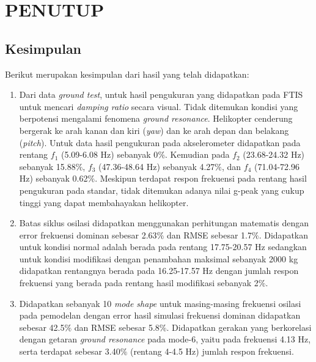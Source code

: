 \chapter{PENUTUP}
\label{chap:penutup}


\section{Kesimpulan}
\label{sec:kesimpulan}
\thispagestyle{newchap}

Berikut merupakan kesimpulan dari hasil yang telah didapatkan:

\begin{enumerate}[nolistsep]

	\item Dari data \textit{ground test}, untuk hasil pengukuran yang didapatkan pada FTIS untuk mencari \textit{damping ratio} secara visual. Tidak ditemukan kondisi yang berpotensi mengalami fenomena \textit{ground resonance}. Helikopter cenderung bergerak ke arah kanan dan kiri (\textit{yaw}) dan ke arah depan dan belakang (\textit{pitch}). Untuk data hasil pengukuran pada akselerometer didapatkan pada rentang $f_1$ (5.09-6.08 Hz) sebanyak 0$\%$. Kemudian pada $f_2$ (23.68-24.32 Hz) sebanyak 15.88$\%$, $f_3$ (47.36-48.64 Hz) sebanyak 4.27$\%$, dan $f_4$ (71.04-72.96 Hz) sebanyak 0.62$\%$. Meskipun terdapat respon frekuensi pada rentang hasil pengukuran pada standar, tidak ditemukan adanya nilai g-peak yang cukup tinggi yang dapat membahayakan helikopter.

	\item Batas siklus osilasi didapatkan menggunakan perhitungan matematis dengan error frekuensi dominan sebesar 2.63$\%$ dan RMSE sebesar 1.7$\%$. Didapatkan untuk kondisi normal adalah berada pada rentang 17.75-20.57 Hz sedangkan untuk kondisi modifikasi dengan penambahan maksimal sebanyak 2000 kg didapatkan rentangnya berada pada 16.25-17.57 Hz dengan jumlah respon frekuensi yang berada pada rentang hasil modifikasi sebanyak 2$\%$.
     
	\item Didapatkan sebanyak 10 \textit{mode shape} untuk masing-masing frekuensi osilasi pada pemodelan dengan error hasil simulasi frekuensi dominan didapatkan sebesar 42.5$\%$ dan RMSE sebesar 5.8$\%$. Didapatkan gerakan yang berkorelasi dengan getaran \textit{ground resonance} pada mode-6, yaitu pada frekuensi 4.13 Hz, serta terdapat sebesar 3.40$\%$ (rentang 4-4.5 Hz) jumlah respon frekuensi.
  
\end{enumerate}

